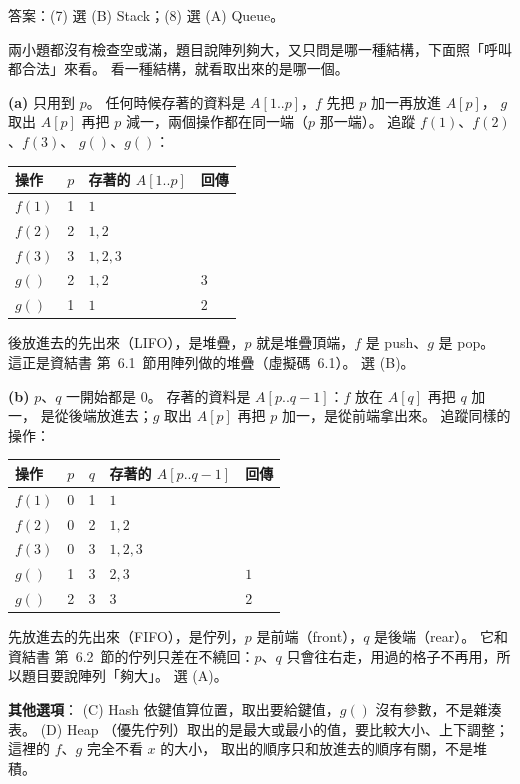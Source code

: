 \begin{pastsoln}
答案：(7) 選 (B) Stack；(8) 選 (A) Queue。

兩小題都沒有檢查空或滿，題目說陣列夠大，又只問是哪一種結構，下面照「呼叫都合法」來看。
看一種結構，就看取出來的是哪一個。

\textbf{(a)} 只用到 $p$。 任何時候存著的資料是 $A[1..p]$，$f$ 先把 $p$ 加一再放進 $A[p]$，
$g$ 取出 $A[p]$ 再把 $p$ 減一，兩個操作都在同一端（$p$ 那一端）。 追蹤 $f(1)$、$f(2)$、$f(3)$、
$g()$、$g()$：
\begin{center}
\begin{tabular}{lcll}
\toprule
操作 & $p$ & 存著的 $A[1..p]$ & 回傳 \\
\midrule
$f(1)$ & 1 & $1$ & \\
$f(2)$ & 2 & $1, 2$ & \\
$f(3)$ & 3 & $1, 2, 3$ & \\
$g()$ & 2 & $1, 2$ & $3$ \\
$g()$ & 1 & $1$ & $2$ \\
\bottomrule
\end{tabular}
\end{center}
後放進去的先出來（LIFO），是堆疊，$p$ 就是堆疊頂端，$f$ 是 push、$g$ 是 pop。 這正是資結書
第~6.1~節用陣列做的堆疊（虛擬碼~6.1）。 選 (B)。

\textbf{(b)} $p$、$q$ 一開始都是 $0$。 存著的資料是 $A[p..q-1]$：$f$ 放在 $A[q]$ 再把 $q$ 加一，
是從後端放進去；$g$ 取出 $A[p]$ 再把 $p$ 加一，是從前端拿出來。 追蹤同樣的操作：
\begin{center}
\begin{tabular}{lccll}
\toprule
操作 & $p$ & $q$ & 存著的 $A[p..q-1]$ & 回傳 \\
\midrule
$f(1)$ & 0 & 1 & $1$ & \\
$f(2)$ & 0 & 2 & $1, 2$ & \\
$f(3)$ & 0 & 3 & $1, 2, 3$ & \\
$g()$ & 1 & 3 & $2, 3$ & $1$ \\
$g()$ & 2 & 3 & $3$ & $2$ \\
\bottomrule
\end{tabular}
\end{center}
先放進去的先出來（FIFO），是佇列，$p$ 是前端（front），$q$ 是後端（rear）。 它和資結書
第~6.2~節的佇列只差在不繞回：$p$、$q$ 只會往右走，用過的格子不再用，所以題目要說陣列「夠大」。
選 (A)。

\textbf{其他選項}： (C) Hash 依鍵值算位置，取出要給鍵值，$g()$ 沒有參數，不是雜湊表。 (D) Heap
（優先佇列）取出的是最大或最小的值，要比較大小、上下調整；這裡的 $f$、$g$ 完全不看 $x$ 的大小，
取出的順序只和放進去的順序有關，不是堆積。
\end{pastsoln}

